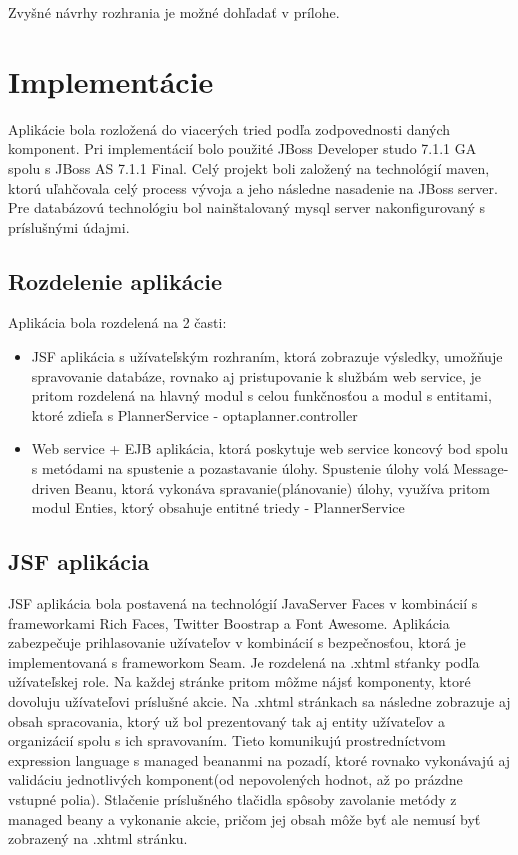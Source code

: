 Zvyšné návrhy rozhrania je možné dohľadať v prílohe.






\section{Implementácie}
Aplikácie bola rozložená do viacerých tried podľa zodpovednosti daných komponent. Pri implementácií bolo použité JBoss Developer studo 7.1.1 GA spolu s JBoss AS 7.1.1 Final. Celý projekt boli založený na technológií maven, ktorú uľahčovala celý process vývoja a jeho následne nasadenie na JBoss server. Pre databázovú technológiu bol nainštalovaný mysql server nakonfigurovaný s príslušnými údajmi.

\subsection{Rozdelenie aplikácie}

	Aplikácia bola rozdelená na 2 časti:
	\begin{itemize}
	\item JSF aplikácia s užívateľským rozhraním, ktorá zobrazuje výsledky, umožňuje spravovanie databáze, rovnako aj pristupovanie k službám web service, je pritom rozdelená na hlavný modul s celou funkčnosťou a modul s entitami, ktoré zdieľa s PlannerService - optaplanner.controller
	\item Web service + EJB aplikácia, ktorá poskytuje web service koncový bod spolu s metódami na spustenie a pozastavanie úlohy. Spustenie úlohy volá Message-driven Beanu, ktorá vykonáva spravanie(plánovanie) úlohy, využíva pritom modul Enties, ktorý obsahuje entitné triedy - PlannerService

	\end{itemize}




\subsection{JSF aplikácia}
JSF aplikácia bola postavená na technológií JavaServer Faces v kombinácií s frameworkami Rich Faces, Twitter Boostrap a Font Awesome.  Aplikácia zabezpečuje prihlasovanie užívateľov v kombinácií s bezpečnosťou, ktorá je implementovaná s frameworkom Seam. Je rozdelená na .xhtml stŕanky podľa užívateľskej role. Na každej stránke pritom môžme nájsť komponenty, ktoré dovoluju užívateľovi príslušné akcie. Na .xhtml stránkach sa následne zobrazuje aj obsah spracovania, ktorý už bol prezentovaný tak aj entity užívateľov a organizácií spolu s ich spravovaním. Tieto komunikujú prostredníctvom expression language s managed beananmi na pozadí, ktoré rovnako vykonávajú aj validáciu jednotlivých komponent(od nepovolených hodnot, až po prázdne vstupné polia). Stlačenie príslušného tlačidla spôsoby zavolanie metódy z managed beany a vykonanie akcie, pričom jej obsah môže byť ale nemusí byť zobrazený na .xhtml stránku.
	

